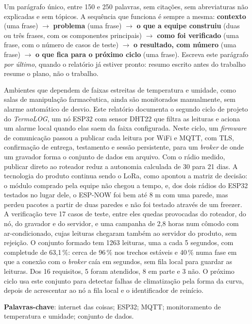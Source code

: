 
\begin{resumo}
\begin{orientacao}
Um parágrafo único, entre 150 e 250 palavras, sem citações, sem
abreviaturas não explicadas e sem tópicos. A sequência que funciona é
sempre a mesma: \textbf{contexto} (uma frase) $\rightarrow$
\textbf{problema} (uma frase) $\rightarrow$ \textbf{o que a equipe
construiu} (duas ou três frases, com os componentes principais)
$\rightarrow$ \textbf{como foi verificado} (uma frase, com o número de
casos de teste) $\rightarrow$ \textbf{o resultado, com número}
(uma frase) $\rightarrow$ \textbf{o que fica para o próximo ciclo}
(uma frase). Escreva este parágrafo \emph{por último}, quando o
relatório já estiver pronto: resumo escrito antes do trabalho resume o
plano, não o trabalho.
\end{orientacao}

Ambientes que dependem de faixas estreitas de temperatura e umidade,
como salas de manipulação farmacêutica, ainda são monitorados
manualmente, sem alarme automático de desvio. Este relatório documenta o
segundo ciclo de projeto do \emph{TermoLOG}, um nó ESP32 com sensor
DHT22 que filtra as leituras e aciona um alarme local quando elas saem da
faixa configurada. Neste ciclo, um \emph{firmware} de comunicação passou
a publicar cada leitura por WiFi e MQTT, com TLS, confirmação de
entrega, testamento e sessão persistente, para um
\emph{broker} de onde um gravador forma o conjunto de dados em arquivo.
Com o rádio medido, publicar direto ao roteador reduz a autonomia
calculada de 30 para 21 dias. A tecnologia do produto continua sendo o
LoRa, como apontou a matriz de decisão: o módulo comprado pela equipe não
chegou a tempo, e, dos dois rádios do ESP32 testados no lugar dele, o
ESP-NOW foi bem até 8 m com uma parede, mas perdeu pacotes a partir de
duas paredes e não foi testado através de um freezer. A verificação teve 17
casos de teste, entre eles quedas provocadas do roteador, do nó, do
gravador e do servidor, e uma campanha de 2,8 horas num cômodo com ar-condicionado,
cujas leituras chegaram também ao servidor do produto, sem rejeição. O conjunto formado tem 1263 leituras, uma a cada
5 segundos, com completude de 63,1\,\%: cerca de 96\,\% nos trechos
estáveis e 40\,\% numa fase em que a conexão com o \emph{broker} caía
em segundos, sem fila local para guardar as leituras. Dos 16
requisitos, 5 foram atendidos, 8 em parte e 3 não. O próximo ciclo usa
este conjunto para detectar falhas de climatização pela forma da curva, depois de
acrescentar ao nó a fila local e o identificador de reinício.

\textbf{Palavras-chave}: internet das coisas; ESP32; MQTT;
monitoramento de temperatura e umidade; conjunto de dados.
\end{resumo}

